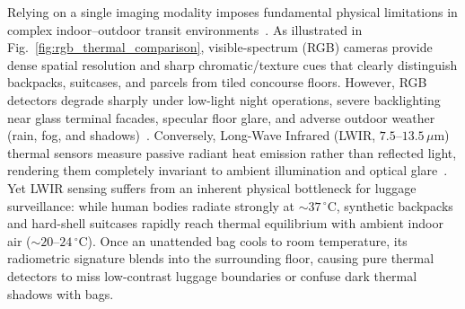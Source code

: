 \documentclass[journal,twoside,web]{ieeecolor}
\begin{document}
Relying on a single imaging modality imposes fundamental physical limitations in complex indoor--outdoor transit environments~\cite{wilson2023recent,ding2025fiafusion,cai2025wavefusion}. As illustrated in Fig.~\ref{fig:rgb_thermal_comparison}, visible-spectrum (RGB) cameras provide dense spatial resolution and sharp chromatic/texture cues that clearly distinguish backpacks, suitcases, and parcels from tiled concourse floors. However, RGB detectors degrade sharply under low-light night operations, severe backlighting near glass terminal facades, specular floor glare, and adverse outdoor weather (rain, fog, and shadows)~\cite{altay2022use,bijelic2020seeing}. Conversely, Long-Wave Infrared (LWIR, $7.5\text{--}13.5\,\mu\text{m}$) thermal sensors measure passive radiant heat emission rather than reflected light, rendering them completely invariant to ambient illumination and optical glare~\cite{breland2021robust}. Yet LWIR sensing suffers from an inherent physical bottleneck for luggage surveillance: while human bodies radiate strongly at ${\sim}37\,^{\circ}\text{C}$, synthetic backpacks and hard-shell suitcases rapidly reach thermal equilibrium with ambient indoor air (${\sim}20\text{--}24\,^{\circ}\text{C}$). Once an unattended bag cools to room temperature, its radiometric signature blends into the surrounding floor, causing pure thermal detectors to miss low-contrast luggage boundaries or confuse dark thermal shadows with bags.
\end{document}
